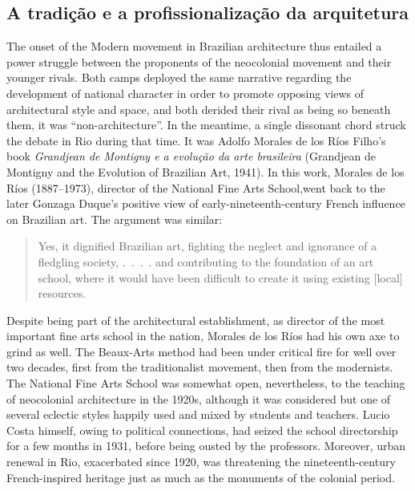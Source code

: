 \hypertarget{a-tradiuxe7uxe3o-e-a-profissionalizauxe7uxe3o-da-arquitetura}{%
\subsection{A tradição e a profissionalização da
arquitetura}\label{a-tradiuxe7uxe3o-e-a-profissionalizauxe7uxe3o-da-arquitetura}}

The onset of the Modern movement in Brazilian architecture thus entailed
a power struggle between the proponents of the neocolonial movement and
their younger rivals. Both camps deployed the same narrative regarding
the development of national character in order to promote opposing views
of architectural style and space, and both derided their rival as being
so beneath them, it was ``non-architecture''. In the meantime, a single
dissonant chord struck the debate in Rio during that time. It was Adolfo
Morales de los Ríos Filho's book \emph{Grandjean de Montigny e a
evolução da arte brasileira} (Grandjean de Montigny and the Evolution of
Brazilian Art, 1941). In this work, Morales de los Ríos (1887--1973),
director of the National Fine Arts School,went back to the later Gonzaga
Duque's positive view of early-nineteenth-century French influence on
Brazilian art. The argument was similar:

\begin{quote}
Yes, it dignified Brazilian art, fighting the neglect and ignorance of a
fledgling society, .~.~.~. and contributing to the foundation of an art
school, where it would have been difficult to create it using existing
{[}local{]} resources. \autocite[p.~157]{morales:1941grandjean}
\end{quote}

Despite being part of the architectural establishment, as director of
the most important fine arts school in the nation, Morales de los Ríos
had his own axe to grind as well. The Beaux-Arts method had been under
critical fire for well over two decades, first from the traditionalist
movement, then from the modernists. The National Fine Arts School was
somewhat open, nevertheless, to the teaching of neocolonial architecture
in the 1920s, although it was considered but one of several eclectic
styles happily used and mixed by students and teachers. Lucio Costa
himself, owing to political connections, had seized the school
directorship for a few months in 1931, before being ousted by the
professors. Moreover, urban renewal in Rio, exacerbated since 1920, was
threatening the nineteenth-century French-inspired heritage just as much
as the monuments of the colonial period.

